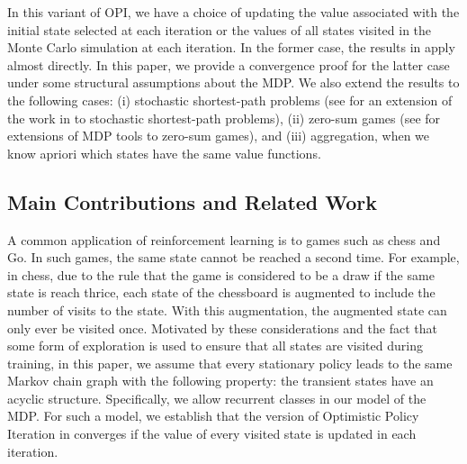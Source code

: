 \documentclass[12pt]{article}
\begin{document}
In this variant of OPI, we have a choice of updating the value associated with the initial state selected at each iteration or the values of all states visited in the Monte Carlo simulation at each iteration. In the former case, the results in \cite{tsitsiklis2002convergence} apply almost directly. In this paper, we provide a convergence proof for the latter case under some structural assumptions about the MDP. We also extend the results to the following cases:  (i) stochastic shortest-path problems (see \cite{Yuanlong} for an extension of the work in \cite{tsitsiklis2002convergence} to stochastic shortest-path problems), (ii) zero-sum games (see \cite{patekthesis} for extensions of MDP tools to zero-sum games), and (iii) aggregation, when we know apriori which states have the same value functions.

\subsection{Main Contributions and Related Work}

A common application of reinforcement learning is to games such as chess and Go. In such games, the same state cannot be reached a second time. For example, in chess, due to the rule that the game is considered to be a draw if the same state is reach thrice, each state of the chessboard is augmented to include the number of visits to the state. With this augmentation, the augmented state can only ever be visited once. Motivated by these considerations and the fact that some form of exploration is used to ensure that all states are visited during training, in this paper, we assume that every stationary policy leads to the same Markov chain graph with the following property: the transient states have an acyclic structure. Specifically, we allow recurrent classes in our model of the MDP. For such a model, we establish that the version of Optimistic Policy Iteration in \cite{tsitsiklis2002convergence} converges if the value of every visited state is updated in each iteration. 
\end{document}
